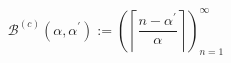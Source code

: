\documentclass{article}
\begin{document}
\begin{titlepage}


\begin{equation*}
\mathcal{B}^{(c)}(\alpha ,\alpha ^{\prime }):=
\left( \left\lceil \frac{n-\alpha ^{\prime }}{\alpha }\right\rceil \right) _{n=1}^{\infty }
\end{equation*}


\end{titlepage}
\end{document}
